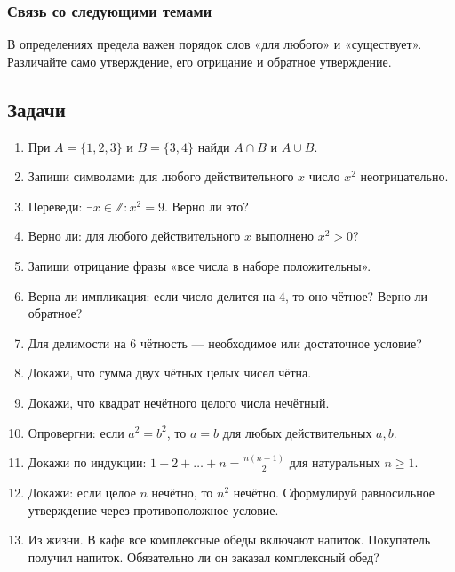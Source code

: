 \documentclass[12pt,a4paper]{article}
\theoremstyle{definition}
\theoremstyle{plain}
\theoremstyle{remark}
\begin{document}
\subsubsection*{Связь со следующими темами}
В определениях предела важен порядок слов «для любого» и «существует». Различайте само утверждение, его отрицание и обратное утверждение.
\subsection*{Задачи}
\begin{enumerate}[label=\thesection.\arabic*.,leftmargin=2.8em,itemsep=12pt]
\item При \(A = \{1,\allowbreak 2,\allowbreak 3\}\) и \(B = \{3,\allowbreak 4\}\) найди \(A \cap  B\) и \(A \cup  B\).
\item Запиши символами: для любого действительного \(x\) число \(x^{2}\) неотрицательно.
\item Переведи: \(\exists  x \in  \mathbb{Z} : x^{2} = 9\). Верно ли это?
\item Верно ли: для любого действительного \(x\) выполнено \(x^{2} > 0\)?
\item Запиши отрицание фразы «все числа в наборе положительны».
\item Верна ли импликация: если число делится на \(4\), то оно чётное? Верно ли обратное?
\item Для делимости на \(6\) чётность — необходимое или достаточное условие?
\item Докажи, что сумма двух чётных целых чисел чётна.
\item Докажи, что квадрат нечётного целого числа нечётный.
\item Опровергни: если \(a^{2} = b^{2}\), то \(a = b\) для любых действительных \(a,\allowbreak b\).
\item Докажи по индукции: \(1 + 2 + \ldots  + n = \frac{n (n + 1)}{2}\) для натуральных \(n \ge  1\).
\item Докажи: если целое \(n\) нечётно, то \(n^{2}\) нечётно. Сформулируй равносильное утверждение через противоположное условие.
\item Из жизни. В кафе все комплексные обеды включают напиток. Покупатель получил напиток. Обязательно ли он заказал комплексный обед?

\end{enumerate}
\end{document}
